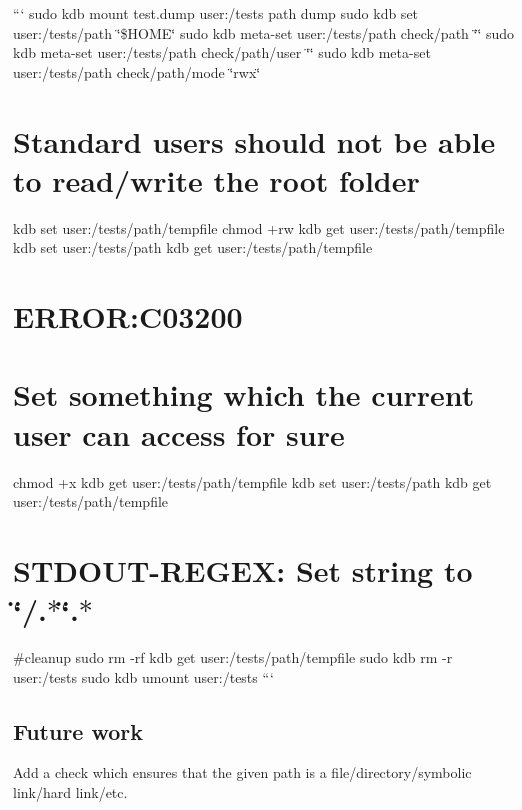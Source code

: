 ``` sudo kdb mount test.\+dump user\+:/tests path dump sudo kdb set user\+:/tests/path \char`\"{}\$\+H\+O\+M\+E\char`\"{} sudo kdb meta-\/set user\+:/tests/path check/path \char`\"{}\char`\"{} sudo kdb meta-\/set user\+:/tests/path check/path/user \char`\"{}\char`\"{} sudo kdb meta-\/set user\+:/tests/path check/path/mode \char`\"{}rwx\char`\"{}\hypertarget{autotoc_md492_autotoc_md496}{}\section{Standard users should not be able to read/write the root folder}\label{autotoc_md492_autotoc_md496}
kdb set user\+:/tests/path/tempfile  chmod +rw {\ttfamily kdb get user\+:/tests/path/tempfile} kdb set user\+:/tests/path {\ttfamily kdb get user\+:/tests/path/tempfile} \hypertarget{autotoc_md492_autotoc_md497}{}\section{E\+R\+R\+O\+R\+:\+C03200}\label{autotoc_md492_autotoc_md497}
\hypertarget{autotoc_md492_autotoc_md498}{}\section{Set something which the current user can access for sure}\label{autotoc_md492_autotoc_md498}
chmod +x {\ttfamily kdb get user\+:/tests/path/tempfile} kdb set user\+:/tests/path {\ttfamily kdb get user\+:/tests/path/tempfile} \hypertarget{autotoc_md492_autotoc_md499}{}\section{S\+T\+D\+O\+U\+T-\/\+R\+E\+G\+E\+X\+: Set string to \char`\"{}/.$\ast$\char`\"{}.$\ast$}\label{autotoc_md492_autotoc_md499}
\#cleanup sudo rm -\/rf {\ttfamily kdb get user\+:/tests/path/tempfile} sudo kdb rm -\/r user\+:/tests sudo kdb umount user\+:/tests ```\hypertarget{autotoc_md492_autotoc_md500}{}\subsection{Future work}\label{autotoc_md492_autotoc_md500}
Add a check which ensures that the given path is a file/directory/symbolic link/hard link/etc. 